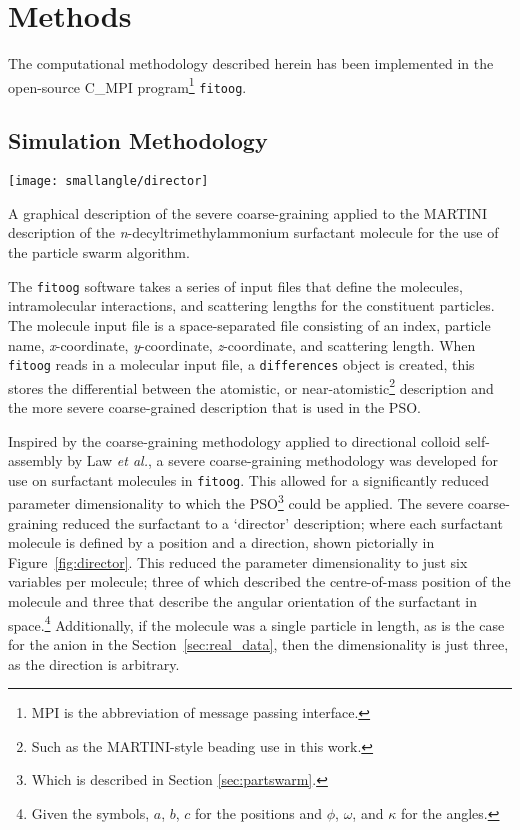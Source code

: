 \section{Methods}
The computational methodology described herein has been implemented in the open-source C\_MPI program\footnote{MPI is the abbreviation of message passing interface.} \texttt{fitoog}.\autocite{mccluskey_arm61/fitoog_2019}

\subsection{Simulation Methodology}
%
\begin{marginfigure}
    \centering
    \texttt{[image: smallangle/director]}
    \caption{A graphical description of the severe coarse-graining applied to the MARTINI description of the \emph{n}-decyltrimethylammonium surfactant molecule for the use of the particle swarm algorithm.}
    \label{fig:director}
\end{marginfigure}
%
The \texttt{fitoog} software takes a series of input files that define the molecules, intramolecular interactions, and scattering lengths for the constituent particles.
The molecule input file is a space-separated file consisting of an index, particle name, \emph{x}-coordinate, \emph{y}-coordinate, \emph{z}-coordinate, and scattering length.
When \texttt{fitoog} reads in a molecular input file, a \texttt{differences} object is created, this stores the differential between the atomistic, or near-atomistic\footnote{Such as the MARTINI-style beading use in this work.} description and the more severe coarse-grained description that is used in the PSO.

Inspired by the coarse-graining methodology applied to directional colloid self-assembly by Law \emph{et al.},\autocite{law_coarse-grained_2016} a severe coarse-graining methodology was developed for use on surfactant molecules in \texttt{fitoog}.
This allowed for a significantly reduced parameter dimensionality to which the PSO\footnote{Which is described in Section \ref{sec:partswarm}.} could be applied.
The severe coarse-graining reduced the surfactant to a `director' description; where each surfactant molecule is defined by a position and a direction, shown pictorially in Figure~\ref{fig:director}.
This reduced the parameter dimensionality to just six variables per molecule; three of which described the centre-of-mass position of the molecule and three that describe the angular orientation of the surfactant in space.\footnote{Given the symbols, $a$, $b$, $c$ for the positions and $\phi$, $\omega$, and $\kappa$ for the angles.}
Additionally, if the molecule was a single particle in length, as is the case for the  anion in the Section~\ref{sec:real_data}, then the dimensionality is just three, as the direction is arbitrary.

